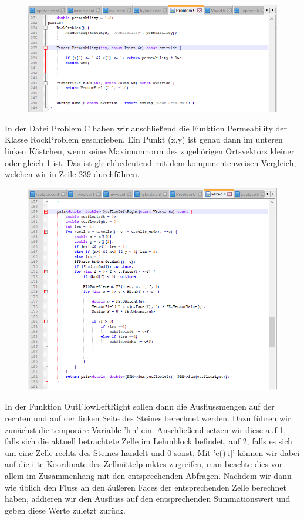 \begin{figure}[H]
	\centering
	\includegraphics[width=\textwidth]{../../19/permprob.png}	
\end{figure}
In der Datei Problem.C haben wir anschließend die Funktion Permeability der Klasse RockProblem geschrieben.
Ein Punkt (x,y) ist genau dann im unteren linken Kästchen, wenn seine Maximumnorm des zugehörigen Ortsvektors kleiner oder gleich 1 ist. 
Das ist gleichbedeutend mit dem komponentenweisen Vergleich, welchen wir in Zeile 239 durchführen.


\begin{figure}[H]
	\centering
	\includegraphics[width=\textwidth]{../../19/mixedoutflow.png}
	
\end{figure}
In der Funktion OutFlowLeftRight sollen dann die Ausflussmengen auf der rechten und auf der linken Seite des Steines berechnet werden. 
Dazu führen wir zunächst die temporäre Variable 'lrn' ein. Anschließend setzen wir diese auf 1, falls sich die aktuell betrachtete Zelle im Lehmblock befindet, auf 2, falls es sich um eine Zelle rechts des Steines handelt und 0 sonst. \newline
Mit 'c()[i]' können wir dabei auf die i-te Koordinate des \underline{Zellmittelpunktes} zugreifen, man beachte dies vor allem im Zusammenhang mit den entsprechenden Abfragen. 
Nachdem wir dann wie üblich den Fluss an den äußeren Faces der entsprechenden Zelle berechnet haben, addieren wir den Ausfluss auf den entsprechenden Summationswert und geben diese Werte zuletzt zurück.

